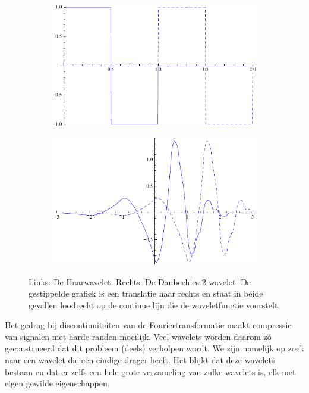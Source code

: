 \begin{figure}[h]
  \centering
  \begin{subfigure}{0.48\linewidth}
    \includegraphics[width=\linewidth]{plaatjes/db1.pdf}
  \end{subfigure}
  \begin{subfigure}{0.48\linewidth}
    \includegraphics[width=\linewidth]{plaatjes/db4.pdf}
  \end{subfigure}
  \caption{Links: De Haarwavelet. Rechts: De Daubechies-2-wavelet. De gestippelde grafiek is een translatie naar rechts en staat in beide gevallen loodrecht op de continue lijn die de waveletfunctie voorstelt.}
\label{fig:wavelets}
\end{figure}

Het gedrag bij discontinuiteiten van de Fouriertransformatie maakt compressie van signalen met harde randen moeilijk. 
Veel wavelets worden daarom z\'o geconstrueerd dat dit probleem (deels) verholpen wordt. 
We zijn namelijk op zoek naar een wavelet die een eindige drager heeft. 
Het blijkt dat deze wavelets bestaan en dat er zelfs een hele grote verzameling van zulke wavelets is, 
elk met eigen gewilde eigenschappen.

